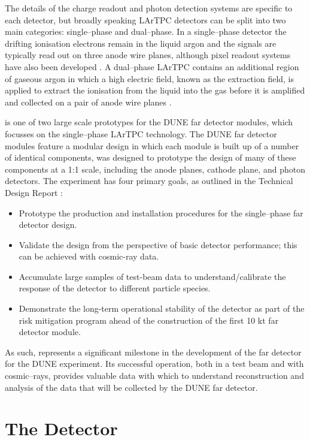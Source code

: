 The details of the charge readout and photon detection systems are specific to 
each detector, but broadly speaking LArTPC detectors can be split into two 
main categories: single--phase and dual--phase. In a single--phase detector the
drifting ionisation electrons remain in the liquid argon and the signals are 
typically read out on three anode wire planes, although pixel readout systems
have also been developed . A dual--phase LArTPC contains an
additional region of gaseous argon in which a high electric field, known as the
extraction field, is applied to extract the ionisation from the liquid into the
gas before it is amplified and collected on a pair of anode wire planes 
\cite{Abi:2020wmh}.

\bigskip
\noindent
\protodune{} is one of two large scale prototypes for the DUNE far detector
modules, which focusses on the single--phase LArTPC technology. The DUNE far
detector modules feature a modular design in which each module is built up of a
number of identical components, \protodune{} was designed to prototype the
design of many of these components at a 1:1 scale, including the anode planes,
cathode plane, and photon detectors. The \protodune{} experiment has four 
primary goals, as outlined in the Technical Design Report \cite{Abi2017}:
\begin{itemize}
	\item Prototype the production and installation procedures for the
		single--phase far detector design.
	\item Validate the design from the perspective of basic detector performance;
		this can be achieved with cosmic-ray data. 
	\item Accumulate large samples of test-beam data to understand/calibrate the
		response of the detector to different particle species.
	\item Demonstrate the long-term operational stability of the detector as part
		of the risk mitigation program ahead of the construction of the first 10 kt
		far detector module.
\end{itemize}
As such, \protodune{} represents a significant milestone in the development of
the far detector for the DUNE experiment. Its successful operation, both in a 
test beam and with cosmic--rays, provides valuable data with which to understand
reconstruction and analysis of the data that will be collected by the DUNE far 
detector.

\section{The \protodune{} Detector} \label{sec:pdsp_detector}

